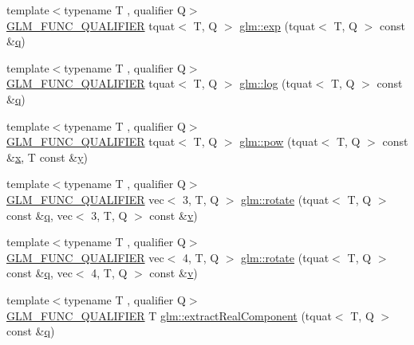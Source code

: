 \begin{DoxyCompactItemize}
\item 
{\footnotesize template$<$typename T , qualifier Q$>$ }\\\hyperlink{setup_8hpp_a33fdea6f91c5f834105f7415e2a64407}{G\+L\+M\+\_\+\+F\+U\+N\+C\+\_\+\+Q\+U\+A\+L\+I\+F\+I\+ER} tquat$<$ T, Q $>$ \hyperlink{group__gtx__quaternion_ga72275e87ce62dc75a06d39a6c049835c}{glm\+::exp} (tquat$<$ T, Q $>$ const \&\hyperlink{_s_d_l__opengl_8h_a8fc1e7b9baaae687804c7eed46ca09c6}{q})
\item 
{\footnotesize template$<$typename T , qualifier Q$>$ }\\\hyperlink{setup_8hpp_a33fdea6f91c5f834105f7415e2a64407}{G\+L\+M\+\_\+\+F\+U\+N\+C\+\_\+\+Q\+U\+A\+L\+I\+F\+I\+ER} tquat$<$ T, Q $>$ \hyperlink{group__gtx__quaternion_gaad510f1a4ea26994b341c094ec4f4eed}{glm\+::log} (tquat$<$ T, Q $>$ const \&\hyperlink{_s_d_l__opengl_8h_a8fc1e7b9baaae687804c7eed46ca09c6}{q})
\item 
{\footnotesize template$<$typename T , qualifier Q$>$ }\\\hyperlink{setup_8hpp_a33fdea6f91c5f834105f7415e2a64407}{G\+L\+M\+\_\+\+F\+U\+N\+C\+\_\+\+Q\+U\+A\+L\+I\+F\+I\+ER} tquat$<$ T, Q $>$ \hyperlink{group__gtx__quaternion_gad382fc37392d537aecf2245a4597d8a3}{glm\+::pow} (tquat$<$ T, Q $>$ const \&\hyperlink{_s_d_l__opengl_8h_ad0e63d0edcdbd3d79554076bf309fd47}{x}, T const \&\hyperlink{_s_d_l__opengl_8h_a1675d9d7bb68e1657ff028643b4037e3}{y})
\item 
{\footnotesize template$<$typename T , qualifier Q$>$ }\\\hyperlink{setup_8hpp_a33fdea6f91c5f834105f7415e2a64407}{G\+L\+M\+\_\+\+F\+U\+N\+C\+\_\+\+Q\+U\+A\+L\+I\+F\+I\+ER} vec$<$ 3, T, Q $>$ \hyperlink{group__gtx__quaternion_ga49730f975e7f0ee3862a20b767aba583}{glm\+::rotate} (tquat$<$ T, Q $>$ const \&\hyperlink{_s_d_l__opengl_8h_a8fc1e7b9baaae687804c7eed46ca09c6}{q}, vec$<$ 3, T, Q $>$ const \&\hyperlink{_s_d_l__opengl_8h_a10a82eabcb59d2fcd74acee063775f90}{v})
\item 
{\footnotesize template$<$typename T , qualifier Q$>$ }\\\hyperlink{setup_8hpp_a33fdea6f91c5f834105f7415e2a64407}{G\+L\+M\+\_\+\+F\+U\+N\+C\+\_\+\+Q\+U\+A\+L\+I\+F\+I\+ER} vec$<$ 4, T, Q $>$ \hyperlink{group__gtx__quaternion_ga97a5f8af1d63056b85a53ac28042fe77}{glm\+::rotate} (tquat$<$ T, Q $>$ const \&\hyperlink{_s_d_l__opengl_8h_a8fc1e7b9baaae687804c7eed46ca09c6}{q}, vec$<$ 4, T, Q $>$ const \&\hyperlink{_s_d_l__opengl_8h_a10a82eabcb59d2fcd74acee063775f90}{v})
\item 
{\footnotesize template$<$typename T , qualifier Q$>$ }\\\hyperlink{setup_8hpp_a33fdea6f91c5f834105f7415e2a64407}{G\+L\+M\+\_\+\+F\+U\+N\+C\+\_\+\+Q\+U\+A\+L\+I\+F\+I\+ER} T \hyperlink{group__gtx__quaternion_ga312385d0a8caa24c1daaa1d00ce4c2d3}{glm\+::extract\+Real\+Component} (tquat$<$ T, Q $>$ const \&\hyperlink{_s_d_l__opengl_8h_a8fc1e7b9baaae687804c7eed46ca09c6}{q})

\end{DoxyCompactItemize}
